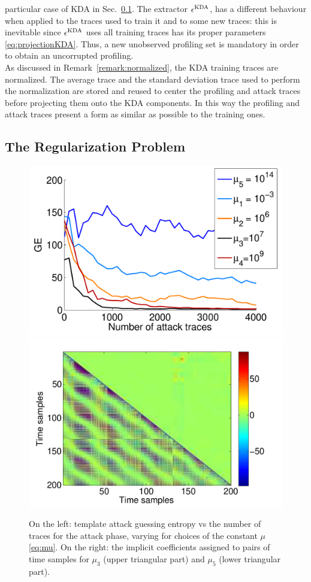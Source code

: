 particular case of KDA in Sec.~\ref{sec:mu}. The extractor $\epsilon^{\mathrm{KDA}}$, has a different behaviour when applied to the traces used to train it and to some new traces: this is inevitable since $\epsilon^{\mathrm{KDA}}$ uses all training traces has its proper parameters \eqref{eq:projectionKDA}. Thus, a new unobserved profiling set is mandatory in order to obtain an uncorrupted profiling.
\\

As discussed in Remark~\ref{remark:normalized}, the KDA training traces are normalized. The average trace and the standard deviation trace used to perform the normalization are stored and reused to center the profiling and attack traces before projecting them onto the KDA components. In this way the profiling and attack traces present a form as similar as possible to the training ones.

\subsection{The Regularization Problem}\label{sec:mu}


\begin{figure}
\includegraphics[width=.5\textwidth]{../Figures/CARDIS2016/mu_comparison_new.pdf} 
\includegraphics[width=.5\textwidth]{../Figures/CARDIS2016/good_bad_coeffs.pdf} 
\caption[Dependence of KDA performances on the regularization parameter $\mu$. Implicit coefficients.]{On the left: template attack guessing entropy vs the number of traces for the attack phase, varying for choices of the constant $\mu$  \eqref{eq:mu}. On the right: the implicit coefficients assigned to pairs of time samples for $\mu_3$ (upper triangular part) and $\mu_5$ (lower triangular part). }\label{fig:mu}
\end{figure}


